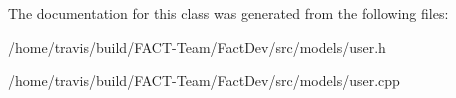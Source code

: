 The documentation for this class was generated from the following files\-:\begin{DoxyCompactItemize}
\item 
/home/travis/build/\-F\-A\-C\-T-\/\-Team/\-Fact\-Dev/src/models/user.\-h\item 
/home/travis/build/\-F\-A\-C\-T-\/\-Team/\-Fact\-Dev/src/models/user.\-cpp\end{DoxyCompactItemize}
